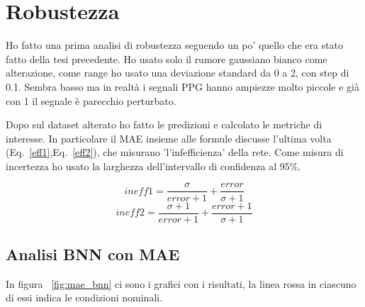 \documentclass[
	letterpaper,
	a4paper,
	cleardoublepage=empty,
	headings=twolinechapter,
	numbers=autoenddot,
]{article}
\newcommand{\Eq}[0]{Eq.}
\begin{document}
	
	\section{Robustezza}
	Ho fatto una prima analisi di robustezza seguendo un po' quello che era stato fatto della tesi precedente. Ho usato solo il rumore gaussiano bianco come alterazione, come range ho usato una deviazione standard da 0 a 2, con step di 0.1. Sembra basso ma in realtà i segnali PPG hanno ampiezze molto piccole e già con 1 il segnale è parecchio perturbato.
	
	Dopo sul dataset alterato ho fatto le predizioni e calcolato le metriche di interesse. In particolare il MAE insieme alle formule discusse l'ultima volta (\Eq~\ref{eff1},\Eq~\ref{eff2}), che misurano 'l'infefficienza' della rete. Come misura di incertezza ho usato la larghezza dell'intervallo di confidenza al 95\%.
	
	\begin{equation}
		\label{eff1}
		ineff1 = \frac{\sigma}{error + 1} + \frac{error}{\sigma + 1}
	\end{equation}
	\begin{equation}
		\label{eff2}
		ineff2 = \frac{\sigma + 1}{error + 1} + \frac{error + 1}{\sigma + 1}
	\end{equation}
	
	\subsection{Analisi BNN con MAE}
	In figura ~\ref{fig:mae_bnn} ci sono i grafici con i risultati, la linea rossa in ciascuno di essi indica le condizioni nominali.
	
\end{document}
